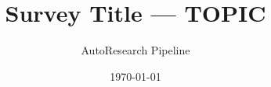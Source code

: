 \documentclass[11pt]{article}
\title{Survey Title — {{TOPIC}}}
\author{AutoResearch Pipeline}
\date{\today}
\begin{document}
\maketitle

\begin{abstract}
\end{abstract}







\end{document}
